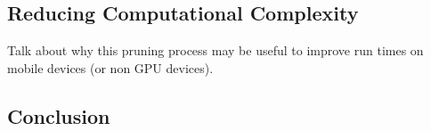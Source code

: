 \documentclass[10pt,twocolumn,letterpaper]{article}
\begin{document}
\subsection{Reducing Computational Complexity}
Talk about why this pruning process may be useful to improve run times on mobile devices (or non GPU devices).

\subsection{Conclusion}



{\small


}
\end{document}

